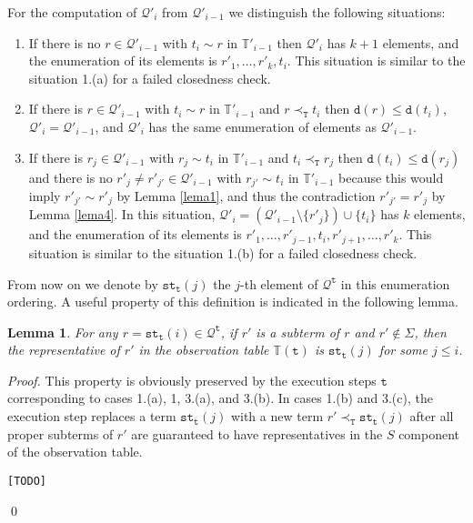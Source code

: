 \documentclass[preprint,12pt,english]{article}
\def\tty{\mathtt{st}}
\def\cQ{\mathcal{Q}}
\def\depth{\mathtt{d}}
\def\ty{\mathtt{t}}
\def\todo{\begin{center}{\color{red}\tt [TODO]}\end{center}}
\newtheorem{lemma}{Lemma}
\begin{document}
{\begin{enumerate}
 For the computation of $\cQ'_i$  from $\cQ'_{i-1}$ we distinguish the following situations: 
 \begin{enumerate}
 \item If there is no $r\in \cQ'_{i-1}$ with $t_i\sim r$ in $\mathbb{T}'_{i-1}$ then $\cQ'_i$ has $k+1$ elements, and the enumeration of its elements is $r'_1,\ldots,r'_k,t_i.$ This situation is similar to the situation 1.(a) for a failed closedness check.
 \item If there is $r\in\cQ'_{i-1}$ with $t_i\sim r$ in $\mathbb{T}'_{i-1}$ and $r\prec_{\mathtt{T}}t_i$ then $\depth(r)\leq\depth(t_i)$, $\cQ'_{i}=\cQ'_{i-1}$, and $\cQ'_{i}$ has the same enumeration of elements as $\cQ'_{i-1}$.
\item If there is $r_j\in\cQ'_{i-1}$ with $r_j\sim t_i$  in $\mathbb{T}'_{i-1}$ and $t_i\prec_{\mathtt{T}}r_j$ then $\depth(t_i)\leq\depth(r_j)$ and there is no  $r'_j\neq r'_{j'}\in \cQ'_{i-1}$ with $r_{j'}\sim t_i$ in $\mathbb{T}'_{i-1}$ because this would imply $r'_{j'}\sim r'_j$ by Lemma \ref{lema1}, and thus the contradiction $r'_{j'}=r'_j$ by Lemma \ref{lema4}.  In this situation, $\cQ'_i=(\cQ'_{i-1}\setminus\{r'_j\})\cup\{t_i\}$ has $k$ elements, and the enumeration of its elements is $r'_1,\ldots,r'_{j-1},t_i,r'_{j+1},\ldots,r'_k$.
This situation is similar to the situation 1.(b) for a failed closedness check.
 \end{enumerate}
\end{enumerate}
From now on we denote by $\tty_\ty(j)$ the $j$-th element of $\cQ^\ty$ in this enumeration ordering. 
A useful property of this definition is indicated in the following lemma.
\begin{lemma}
For any  $r=\tty_\ty(i)\in\cQ^\ty$, if $r'$ is a subterm of $r$ and $r'\not\in\Sigma$, then the representative of $r'$ in the observation table $\mathbb{T}(\ty)$ is $\tty_\ty(j)$ for some $j\leq i$.
\end{lemma}
\begin{proof}
This property is obviously preserved by the execution steps $\ty$ corresponding to cases 1.(a), 1, 3.(a), and 3.(b). In cases 1.(b) and 3.(c), the execution step replaces a term $\tty_\ty(j)$ with a new term $r'\prec_{\mathtt{T}}\tty_\ty(j)$ after all proper subterms of $r'$ are guaranteed to have representatives in the $S$ component of the observation table.
\todo
\qed
\end{proof}
}
\end{document}
